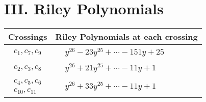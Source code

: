 \documentclass[1p]{elsarticle_modified}
\theoremstyle{definition}
\begin{document}
\centering \section*{ III. Riley Polynomials}
\begin{tabular}{m{50pt}|m{274pt}}
Crossings & \hspace{64pt}Riley Polynomials at each crossing \\
\hline $$\begin{aligned}c_{1},c_{7},c_{9}\end{aligned}$$&$\begin{aligned}
&y^{26}-23 y^{25}+\cdots-151 y+25
\end{aligned}$\\
\hline $$\begin{aligned}c_{2},c_{3},c_{8}\end{aligned}$$&$\begin{aligned}
&y^{26}+21 y^{25}+\cdots-11 y+1
\end{aligned}$\\
\hline $$\begin{aligned}c_{4},c_{5},c_{6}\\c_{10},c_{11}\end{aligned}$$&$\begin{aligned}
&y^{26}+33 y^{25}+\cdots-11 y+1
\end{aligned}$\\
\hline
\end{tabular}
\vskip 2pc
\end{document}
